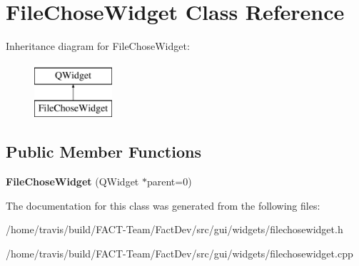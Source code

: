 \hypertarget{classFileChoseWidget}{\section{File\-Chose\-Widget Class Reference}
\label{classFileChoseWidget}
}
Inheritance diagram for File\-Chose\-Widget\-:\begin{figure}[H]
\begin{center}
\leavevmode
\includegraphics[height=2.000000cm]{d4/d92/classFileChoseWidget}
\end{center}
\end{figure}
\subsection*{Public Member Functions}
\begin{DoxyCompactItemize}
\item 
\hypertarget{classFileChoseWidget_a4da526f6e1bc5ad021d948665838a9c9}{{\bfseries File\-Chose\-Widget} (Q\-Widget $\ast$parent=0)}\label{classFileChoseWidget_a4da526f6e1bc5ad021d948665838a9c9}

\end{DoxyCompactItemize}


The documentation for this class was generated from the following files\-:\begin{DoxyCompactItemize}
\item 
/home/travis/build/\-F\-A\-C\-T-\/\-Team/\-Fact\-Dev/src/gui/widgets/filechosewidget.\-h\item 
/home/travis/build/\-F\-A\-C\-T-\/\-Team/\-Fact\-Dev/src/gui/widgets/filechosewidget.\-cpp\end{DoxyCompactItemize}
